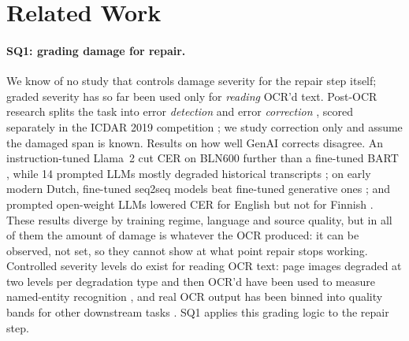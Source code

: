 \section{Related Work}

\paragraph{SQ1: grading damage for repair.} We know of no study that controls damage severity for the repair step
itself; graded severity has so far been used only for \emph{reading} OCR'd text. Post-OCR research splits the task
into error \emph{detection} and error \emph{correction} \citep{nguyen2021survey}, scored separately in the ICDAR 2019
competition \citep{rigaud2019icdar}; we study correction only and assume the damaged span is known. Results on how
well GenAI corrects disagree. An instruction-tuned Llama~2 cut CER on BLN600 further than a fine-tuned BART
\citep{thomas2024leveraging}, while 14 prompted LLMs mostly degraded historical transcripts
\citep{boros2024postcorrection}; on early modern Dutch, fine-tuned seq2seq models beat fine-tuned generative ones
\citep{debaene2025evaluating}; and prompted open-weight LLMs lowered CER for English but not for Finnish
\citep{kanerva2025ocr}. These results diverge by training regime, language and source quality, but in all of them
the amount of damage is whatever the OCR produced: it can be observed, not set, so they cannot show at what point
repair stops working. Controlled severity levels do exist for reading OCR text: page images degraded at two levels
per degradation type and then OCR'd have been used to measure named-entity recognition \citep{hamdi2020assessing},
and real OCR output has been binned into quality bands for other downstream tasks \citep{vanstrien2020assessing}.
SQ1 applies this grading logic to the repair step.

